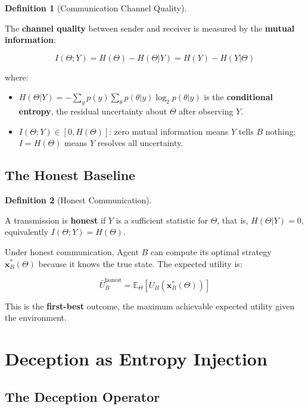 \documentclass[11pt]{article}
\theoremstyle{plain}
\theoremstyle{definition}
\newtheorem{definition}{Definition}
\theoremstyle{remark}
\let\origsection\section
\renewcommand{\section}{\needspace{12\baselineskip}\origsection}
\let\origsubsection\subsection
\renewcommand{\subsection}{\needspace{7\baselineskip}\origsubsection}
\begin{document}
\begin{definition}[Communication Channel Quality]
\label{def-channel-quality}

The \textbf{channel quality} between sender and receiver is measured by the \textbf{mutual information}:

$$I(\Theta; Y) = H(\Theta) - H(\Theta | Y) = H(Y) - H(Y | \Theta)$$

where:
\begin{itemize}
\item $H(\Theta | Y) = -\sum_{y} p(y) \sum_{\theta} p(\theta | y) \log_2 p(\theta | y)$ is the \textbf{conditional entropy}, the residual uncertainty about $\Theta$ after observing $Y$.
\item $I(\Theta; Y) \in [0, H(\Theta)]$: zero mutual information means $Y$ tells $B$ nothing; $I = H(\Theta)$ means $Y$ resolves all uncertainty.
\end{itemize}

\end{definition}

\subsection{The Honest Baseline}\label{the-honest-baseline}

\begin{definition}[Honest Communication]
\label{def-honest-communication}

A transmission is \textbf{honest} if $Y$ is a sufficient statistic for $\Theta$, that is, $H(\Theta | Y) = 0$, equivalently $I(\Theta; Y) = H(\Theta)$.
\end{definition}

Under honest communication, Agent \(B\) can compute its optimal strategy
\(\mathbf{x}_B^*(\Theta)\) because it knows the true state. The expected
utility is:

\[\bar{U}_B^{\text{honest}} = \mathbb{E}_\Theta\left[ U_B\left(\mathbf{x}_B^*(\Theta)\right) \right]\]

This is the \textbf{first-best} outcome, the maximum achievable expected
utility given the environment.

\section{Deception as Entropy
Injection}\label{deception-as-entropy-injection}

\subsection{The Deception Operator}\label{the-deception-operator}
\end{document}
